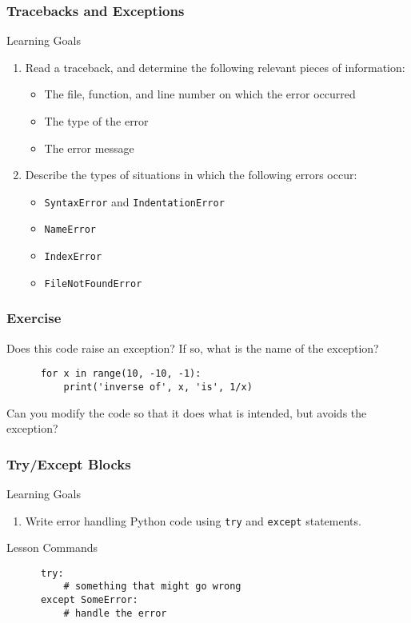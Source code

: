 \documentclass{beamer}
\begin{document}


\begin{frame}[label=tracebacks_exceptions]
  \frametitle{Tracebacks and Exceptions}
  \begin{block}{Learning Goals}
    \begin{enumerate}
      \item Read a traceback, and determine the following relevant pieces of information:
      \begin{itemize}
        \item The file, function, and line number on which the error occurred
        \item The type of the error
        \item The error message
      \end{itemize}
    \item Describe the types of situations in which the following errors occur:
      \begin{itemize}
        \item\texttt{SyntaxError} and \texttt{IndentationError}
        \item\texttt{NameError}
        \item\texttt{IndexError}
        \item\texttt{FileNotFoundError}
      \end{itemize}
    \end{enumerate}
  \end{block}
\end{frame}


\begin{frame}[fragile]
  \frametitle{Exercise}
  \begin{block}{}
    Does this code raise an exception?
    If so, what is the name of the exception?
    \begin{verbatim}
      for x in range(10, -10, -1):
          print('inverse of', x, 'is', 1/x)
    \end{verbatim}
    Can you modify the code so that it does what is intended,
    but avoids the exception?
  \end{block}
\end{frame}


\begin{frame}[fragile]
  \frametitle{Try/Except Blocks}
  \begin{block}{Learning Goals}
    \begin{enumerate}
      \item Write error handling Python code using \texttt{try} and \texttt{except} statements.
    \end{enumerate}
  \end{block}
  \begin{block}{Lesson Commands}
    \begin{verbatim}
      try:
          # something that might go wrong
      except SomeError:
          # handle the error
    \end{verbatim}
  \end{block}
\end{frame}
\end{document}
